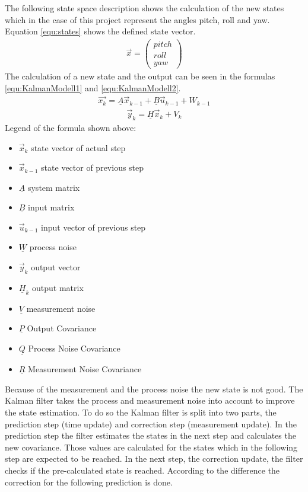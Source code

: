 The following state space description shows the calculation of the new states which in the case of this project represent the angles pitch, roll and yaw. Equation \ref{equ:states} shows the defined state vector.
\begin{align}
\vec x = \begin{pmatrix} pitch \\ roll \\ yaw \end{pmatrix}
\label{equ:states}
\end{align}
The calculation of a new state and the output can be seen in the formulas \ref{equ:KalmanModell1} and \ref{equ:KalmanModell2}.
\begin{align}
\vec{x_k} = \underline{A}\vec x_{k-1}+\underline{B}\vec u_{k-1} + W_{k-1}
\label{equ:KalmanModell1}
\end{align}
\begin{align}
\vec y_k = \underline{H}\vec x_k+ V_k
\label{equ:KalmanModell2}
\end{align}
Legend of the formula shown above:\\
\begin{itemize}
	\item $\vec{x}_k$ state vector of actual step
	\item $\vec{x}_{k-1}$ state vector of previous step
	\item $\underline{A}$ system matrix
	\item $\underline{B}$ input matrix
	\item $\vec{u}_{k-1}$ input vector of previous step
	\item $\underline{W}$ process noise
	\item $\vec{y}_{k}$ output vector
	\item $\underline{H}_k$ output matrix
	\item $\underline{V}$ measurement noise
	\item $\underline{P}$ Output Covariance
	\item $\underline{Q}$ Process Noise Covariance
	\item $\underline{R}$ Measurement Noise Covariance
\end{itemize}
Because of the measurement and the process noise the new state is not good. The Kalman filter takes the process and measurement noise into account to improve the state estimation. To do so the Kalman filter is split into two parts, the prediction step (time update) and correction step (measurement update). In the prediction step the filter estimates the states in the next step and calculates the new covariance. Those values are calculated for the states which in the following step are expected to be reached. In the next step, the correction update, the filter checks if the pre-calculated state is reached. According to the difference the correction for the following prediction is done.\\\\
